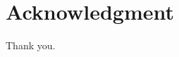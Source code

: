 \documentclass[a4paper,11pt,oneside,openany]{book}
\begin{document}

\backmatter
\chapter{Acknowledgment}
Thank you.




\end{document}
